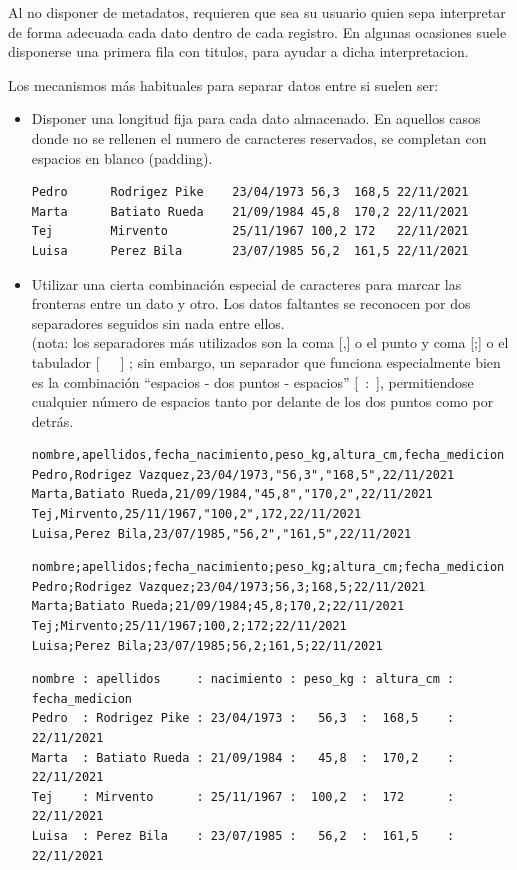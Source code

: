 \documentclass[spanish,12pt,a4paper,final,oneside]{book}
\begin{document}
Al no disponer de metadatos, requieren que sea su usuario quien sepa interpretar de forma adecuada cada dato dentro de cada registro. En algunas ocasiones suele disponerse una primera fila con titulos, para ayudar a dicha interpretacion. 

Los mecanismos más habituales para separar datos entre si suelen ser:
\begin{itemize}
\item Disponer una longitud fija para cada dato almacenado. En aquellos casos donde no se rellenen el numero de caracteres reservados, se completan con espacios en blanco (padding).

\begin{lstlisting}[frame=single, basicstyle=\scriptsize]
Pedro      Rodrigez Pike    23/04/1973 56,3  168,5 22/11/2021
Marta      Batiato Rueda    21/09/1984 45,8  170,2 22/11/2021
Tej        Mirvento         25/11/1967 100,2 172   22/11/2021
Luisa      Perez Bila       23/07/1985 56,2  161,5 22/11/2021
\end{lstlisting}

\item Utilizar una cierta combinación especial de caracteres para marcar las fronteras entre un dato y otro. Los datos faltantes se reconocen por dos separadores seguidos sin nada entre ellos.
\\ (nota: los separadores más utilizados son la coma [,] o el punto y coma [;] o el tabulador [\ \ \ ] ; sin embargo, un separador que funciona especialmente bien es la combinación “espacios - dos puntos - espacios”  [\ :\ ], permitiendose cualquier número de espacios tanto por delante de los dos puntos como por detrás.

\begin{lstlisting}[frame=single, basicstyle=\scriptsize]
nombre,apellidos,fecha_nacimiento,peso_kg,altura_cm,fecha_medicion
Pedro,Rodrigez Vazquez,23/04/1973,"56,3","168,5",22/11/2021
Marta,Batiato Rueda,21/09/1984,"45,8","170,2",22/11/2021
Tej,Mirvento,25/11/1967,"100,2",172,22/11/2021
Luisa,Perez Bila,23/07/1985,"56,2","161,5",22/11/2021
\end{lstlisting}

\begin{lstlisting}[frame=single, basicstyle=\scriptsize]
nombre;apellidos;fecha_nacimiento;peso_kg;altura_cm;fecha_medicion
Pedro;Rodrigez Vazquez;23/04/1973;56,3;168,5;22/11/2021
Marta;Batiato Rueda;21/09/1984;45,8;170,2;22/11/2021
Tej;Mirvento;25/11/1967;100,2;172;22/11/2021
Luisa;Perez Bila;23/07/1985;56,2;161,5;22/11/2021
\end{lstlisting}

\begin{lstlisting}[frame=single, basicstyle=\scriptsize]
nombre : apellidos     : nacimiento : peso_kg : altura_cm : fecha_medicion
Pedro  : Rodrigez Pike : 23/04/1973 :   56,3  :  168,5    : 22/11/2021
Marta  : Batiato Rueda : 21/09/1984 :   45,8  :  170,2    : 22/11/2021
Tej    : Mirvento      : 25/11/1967 :  100,2  :  172      : 22/11/2021
Luisa  : Perez Bila    : 23/07/1985 :   56,2  :  161,5    : 22/11/2021
\end{lstlisting}


\end{itemize}
\end{document}
